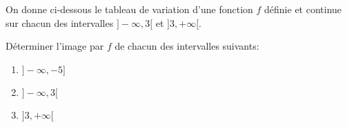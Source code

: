 \documentclass[12pt,a4paper,x11names,usenames,dvipsnames,svgnames,oneside]{book}
\begin{document}
\begin{exr}
On donne ci-dessous le tableau de variation d'une fonction $f$ définie et continue sur chacun des intervalles $]-\infty,3[$ et $]3,+\infty[$.
\begin{center}
\end{center}
Déterminer l'image par $f$ de chacun des intervalles suivants:
\begin{multicols}{3}
\begin{enumerate}
\item $]-\infty,-5]$
\item $]-\infty,3[$
\item $]3,+\infty[$
\end{enumerate}
\end{multicols}
\end{exr}
\end{document}
